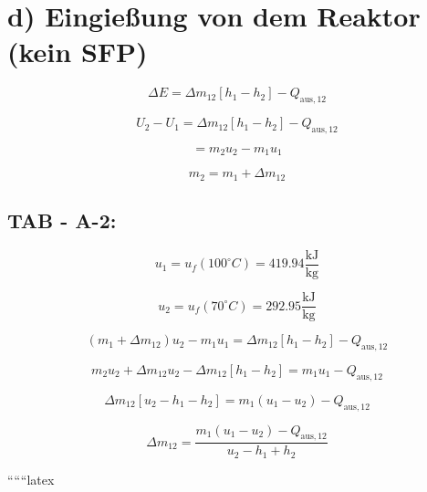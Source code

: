 \section*{d) Eingießung von dem Reaktor (kein SFP)}

\[
\Delta E = \Delta m_{12} \left[ h_1 - h_2 \right] - Q_{\text{aus},12}
\]

\[
U_2 - U_1 = \Delta m_{12} \left[ h_1 - h_2 \right] - Q_{\text{aus},12}
\]

\[
= m_2 u_2 - m_1 u_1
\]

\[
m_2 = m_1 + \Delta m_{12}
\]

\subsection*{TAB - A-2:}

\[
u_1 = u_f (100^\circ C) = 419.94 \frac{\text{kJ}}{\text{kg}}
\]

\[
u_2 = u_f (70^\circ C) = 292.95 \frac{\text{kJ}}{\text{kg}}
\]

\[
(m_1 + \Delta m_{12}) u_2 - m_1 u_1 = \Delta m_{12} \left[ h_1 - h_2 \right] - Q_{\text{aus},12}
\]

\[
m_2 u_2 + \Delta m_{12} u_2 - \Delta m_{12} \left[ h_1 - h_2 \right] = m_1 u_1 - Q_{\text{aus},12}
\]

\[
\Delta m_{12} \left[ u_2 - h_1 - h_2 \right] = m_1 (u_1 - u_2) - Q_{\text{aus},12}
\]

\[
\Delta m_{12} = \frac{m_1 (u_1 - u_2) - Q_{\text{aus},12}}{u_2 - h_1 + h_2}
\]

``````latex